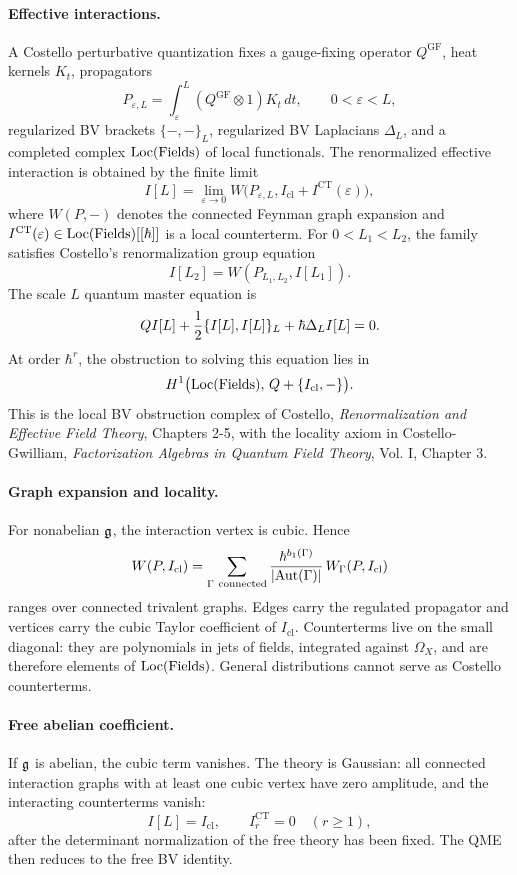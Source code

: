 \paragraph{Effective interactions.}
A Costello perturbative quantization fixes a gauge-fixing operator
\(Q^{\mathrm{GF}}\), heat kernels \(K_t\), propagators
\[
  P_{\varepsilon,L}
  =
  \int_{\varepsilon}^{L}
  (Q^{\mathrm{GF}}\otimes1)K_t\,dt,
  \qquad 0<\varepsilon<L,
\]
regularized BV brackets \(\{-,-\}_L\), regularized BV Laplacians
\(\Delta_L\), and a completed complex
\(\mathrm{Loc}(\mathrm{Fields})\) of local functionals.  The renormalized effective
interaction is obtained by the finite limit
\[
  I[L]
  =
  \lim_{\varepsilon\to0}
  W\bigl(P_{\varepsilon,L},
    I_{\mathrm{cl}}+I^{\mathrm{CT}}(\varepsilon)\bigr),
\]
where \(W(P,-)\) denotes the connected Feynman graph expansion and
\(I^{\mathrm{CT}}(\varepsilon)\in\mathrm{Loc}(\mathrm{Fields})[[\hbar]]\) is a local
counterterm.  For \(0<L_1<L_2\), the family satisfies Costello's
renormalization group equation
\[
  I[L_2]=W(P_{L_1,L_2},I[L_1]).
\]
The scale \(L\) quantum master equation is
\[
  QI[L]+\frac12\{I[L],I[L]\}_L+\hbar\Delta_L I[L]=0.
\]
At order \(\hbar^r\), the obstruction to solving this equation lies in
\[
  H^1\bigl(\mathrm{Loc}(\mathrm{Fields}),\, Q+\{I_{\mathrm{cl}},-\}\bigr).
\]
This is the local BV obstruction complex of Costello,
\emph{Renormalization and Effective Field Theory}, Chapters 2-5, with
the locality axiom in Costello-Gwilliam, \emph{Factorization Algebras in
Quantum Field Theory}, Vol. I, Chapter 3.

\paragraph{Graph expansion and locality.}
For nonabelian \(\mathfrak{g}\), the interaction vertex is cubic.  Hence
\[
  W(P,I_{\mathrm{cl}})
  =
  \sum_{\Gamma\ \mathrm{connected}}
  \frac{\hbar^{b_1(\Gamma)}}{|\mathrm{Aut}(\Gamma)|}\,
  W_\Gamma(P,I_{\mathrm{cl}})
\]
ranges over connected trivalent graphs.  Edges carry the regulated
propagator and vertices carry the cubic Taylor coefficient of
\(I_{\mathrm{cl}}\).  Counterterms live on the small diagonal: they are
polynomials in jets of fields, integrated against \(\Omega_X\), and are
therefore elements of \(\mathrm{Loc}(\mathrm{Fields})\).  General distributions cannot
serve as Costello counterterms.

\paragraph{Free abelian coefficient.}
If \(\mathfrak{g}\) is abelian, the cubic term vanishes.  The theory is Gaussian:
all connected interaction graphs with at least one cubic vertex have
zero amplitude, and the interacting counterterms vanish:
\[
  I[L]=I_{\mathrm{cl}},
  \qquad
  I^{\mathrm{CT}}_r=0\quad(r\geq1),
\]
after the determinant normalization of the free theory has been fixed.
The QME then reduces to the free BV identity.

